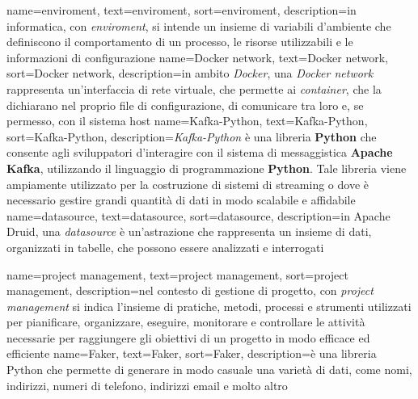 {
    name={enviroment},
    text=enviroment,
    sort=enviroment,
    description={in informatica, con \textit{enviroment}, si intende un insieme di variabili d'ambiente che definiscono il comportamento di un processo, le risorse utilizzabili e le informazioni di configurazione}
}
{
    name={Docker network},
    text=Docker network,
    sort=Docker network,
    description={in ambito \textit{Docker}, una \textit{Docker network} rappresenta un'interfaccia di rete virtuale, che permette ai \textit{container}, che la dichiarano nel proprio file di configurazione, di comunicare tra loro e, se permesso, con il sistema host}
}
{
    name={Kafka-Python},
    text=Kafka-Python,
    sort=Kafka-Python,
    description={\textit{Kafka-Python} è una libreria \textbf{Python} che consente agli sviluppatori d'interagire con il sistema di messaggistica \textbf{Apache Kafka}, utilizzando il linguaggio di programmazione \textbf{Python}. Tale libreria viene ampiamente utilizzato per la costruzione di sistemi di streaming o dove è necessario gestire grandi quantità di dati in modo scalabile e affidabile}
}
{
    name={datasource},
    text=datasource,
    sort=datasource,
    description={in Apache Druid, una \textit{datasource} è un'astrazione che rappresenta un insieme di dati, organizzati in tabelle, che possono essere analizzati e interrogati}
}

{
    name={project management},
    text=project management,
    sort=project management,
    description={nel contesto di gestione di progetto, con \textit{project management} si indica l'insieme di pratiche, metodi, processi e strumenti utilizzati per pianificare, organizzare, eseguire, monitorare e controllare le attività necessarie per raggiungere gli obiettivi di un progetto in modo efficace ed efficiente}
}
{
    name={Faker},
    text=Faker,
    sort=Faker,
    description={è una libreria Python che permette di generare in modo casuale una varietà di dati, come nomi, indirizzi, numeri di telefono, indirizzi email e molto altro}
}